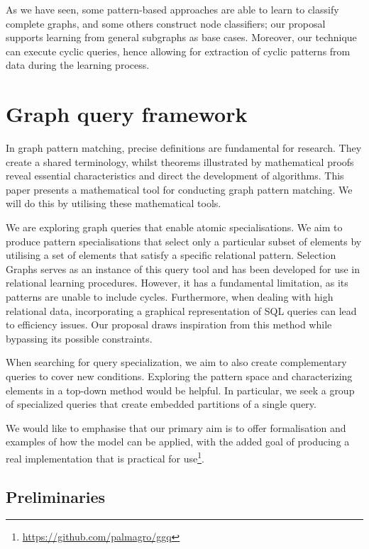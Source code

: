 \documentclass[mathematics,article,submit,pdftex,moreauthors]{Definitions/mdpi}
\begin{document}
As we have seen, some pattern-based approaches are able to learn to classify complete graphs, and some others construct node classifiers; our proposal supports learning from general subgraphs as base cases. Moreover, our technique can execute cyclic queries, hence allowing for extraction of cyclic patterns from data during the learning process. 


\section{Graph query framework}
\label{ggq}

In graph pattern matching, precise definitions are fundamental for research. They create a shared terminology, whilst theorems illustrated by mathematical proofs reveal essential characteristics and direct the development of algorithms. This paper presents a mathematical tool for conducting graph pattern matching. We will do this by utilising these mathematical tools.

We are exploring graph queries that enable atomic specialisations. We aim to produce pattern specialisations that select only a particular subset of elements by utilising a set of elements that satisfy a specific relational pattern. Selection Graphs serves as an instance of this query tool and has been developed for use in relational learning procedures. However, it has a fundamental limitation, as its patterns are unable to include cycles. Furthermore, when dealing with high relational data, incorporating a graphical representation of SQL queries can lead to efficiency issues. Our proposal draws inspiration from this method while bypassing its possible constraints. 

When searching for query specialization, we aim to also create complementary queries to cover new conditions. Exploring the pattern space and characterizing elements in a top-down method would be helpful. In particular, we seek a group of specialized queries that create embedded partitions of a single query.

We would like to emphasise that our primary aim is to offer formalisation and examples of how the model can be applied, with the added goal of producing a real implementation that is practical for use\footnote{\url{https://github.com/palmagro/ggq}}.


\subsection{Preliminaries}
\end{document}
